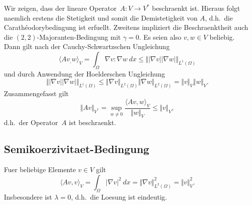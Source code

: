 \documentclass{article}
\begin{document}
Wir zeigen, dass der lineare Operator~$A: V \rightarrow V^*$ beschraenkt ist. Hieraus folgt naemlich erstens die Stetigkeit und somit die Demistetigkeit von $A$, d.h.\ die Carath\'eodorybedingung ist erfuellt. Zweitens impliziert die Beschraenkt\-heit auch die $(2, 2)$-Majoranten-Bedingung mit $\gamma=0$. Es seien also $v,w \in V$ beliebig. Dann gilt nach der Cauchy-Schwartzschen Ungleichung
\begin{equation*}
  \langle Av_, w \rangle_V
  = \int_{\Omega} \nabla v : \nabla w \ dx
  \leq {\Vert \vert \nabla v \vert \vert \nabla w \vert \Vert}_{L^1(\Omega)}
\end{equation*}
und durch Anwendung der Hoelderschen Ungleichung
\begin{equation*}
  {\Vert \vert \nabla v \vert \vert \nabla w \vert \Vert}_{L^1(\Omega)}
  \leq {\Vert \nabla v \Vert}_{L^2(\Omega)} {\Vert \nabla w \Vert}_{L^2(\Omega)}
  = {\Vert v \Vert}_{V} {\Vert w \Vert}_{V}.
\end{equation*}
Zusammengefasst gilt
\begin{equation*}
  {\Vert Av \Vert}_{V^*}
  = \sup_{w \ne 0} \frac{{\langle Av, w \rangle}_V}{{\Vert w \Vert}_V}
  \leq {\Vert v \Vert}_{V},
\end{equation*}
d.h.\ der Operator~$A$ ist beschraenkt.

\subsection*{Semikoerzivitaet-Bedingung}

Fuer beliebige Elemente $v \in V$ gilt
\begin{equation*}
  {\langle Av, v \rangle}_V
  = \int_{\Omega} {\vert \nabla v \vert}^2 \ dx
  = {\Vert \nabla v \Vert}_{L^2(\Omega)}^2
  = {\Vert v \Vert}_V^2.
\end{equation*}
Insbesondere ist $\lambda=0$, d.h.\ die Loesung ist eindeutig.
\end{document}
